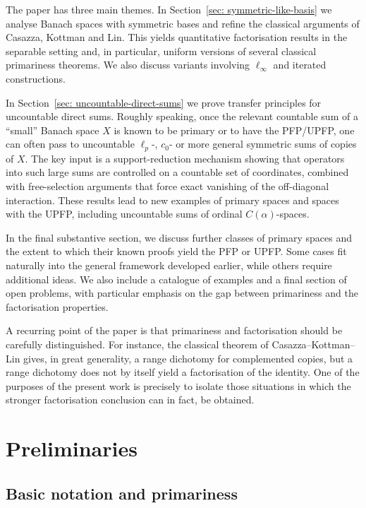 \documentclass[11pt]{amsart}
\theoremstyle{plain}
\theoremstyle{definition}
\numberwithin{equation}{section}
\begin{document}
The paper has three main themes.
In Section~\ref{sec: symmetric-like-basis} we analyse Banach spaces with symmetric bases and refine the classical arguments of Casazza, Kottman and Lin.
This yields quantitative factorisation results in the separable setting and, in particular, uniform versions of several classical primariness theorems.
We also discuss variants involving $\ell_\infty$ and iterated constructions.

In Section~\ref{sec: uncountable-direct-sums} we prove transfer principles for uncountable direct sums.
Roughly speaking, once the relevant countable sum of a ``small'' Banach space $X$ is known to be primary or to have the PFP/UPFP,
one can often pass to uncountable $\ell_p$-, $c_0$- or more general symmetric sums of copies of $X$.
The key input is a support-reduction mechanism showing that operators into such large sums are controlled on a countable set of coordinates,
combined with free-selection arguments that force exact vanishing of the off-diagonal interaction.
These results lead to new examples of primary spaces and spaces with the UPFP, including uncountable sums of ordinal $C(\alpha)$-spaces.

In the final substantive section, we discuss further classes of primary spaces and the extent to which their known proofs yield the PFP or UPFP.
Some cases fit naturally into the general framework developed earlier, while others require additional ideas.
We also include a catalogue of examples and a final section of open problems, with particular emphasis on the gap between primariness and the factorisation properties.

A recurring point of the paper is that primariness and factorisation should be carefully distinguished.
For instance, the classical theorem of Casazza--Kottman--Lin gives, in great generality, a range dichotomy for complemented copies,
but a range dichotomy does not by itself yield a factorisation of the identity.
One of the purposes of the present work is precisely to isolate those situations in which the stronger factorisation conclusion can in fact, be obtained.


\section{Preliminaries}\label{sec:prelim}

\subsection{Basic notation and primariness}
\end{document}
